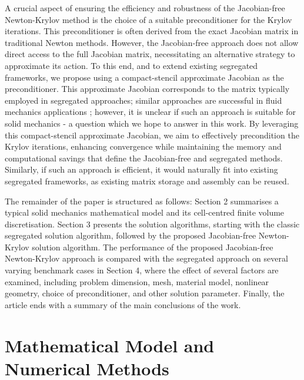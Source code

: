 \documentclass[sn-mathphys,Numbered]{sn-jnl}%
\begin{document}
A crucial aspect of ensuring the efficiency and robustness of the Jacobian-free Newton-Krylov method is the choice of a suitable preconditioner for the Krylov iterations.
This preconditioner is often derived from the exact Jacobian matrix in traditional Newton methods.
However, the Jacobian-free approach does not allow direct access to the full Jacobian matrix, necessitating an alternative strategy to approximate its action.
To this end, and to extend existing segregated frameworks, we propose using a compact-stencil approximate Jacobian as the preconditioner. This approximate Jacobian corresponds to the matrix typically employed in segregated approaches; similar approaches are successful in fluid mechanics applications \citep{Nishikawa2020, nonNewtonianJFNKPaper}; however, it is unclear if such an approach is suitable for solid mechanics - a question which we hope to answer in this work.
By leveraging this compact-stencil approximate Jacobian, we aim to effectively precondition the Krylov iterations, enhancing convergence while maintaining the memory and computational savings that define the Jacobian-free and segregated methods.
Similarly, if such an approach is efficient, it would naturally fit into existing segregated frameworks, as existing matrix storage and assembly can be reused.

The remainder of the paper is structured as follows:
Section 2 summarises a typical solid mechanics mathematical model and its cell-centred finite volume discretisation.
Section 3 presents the solution algorithms, starting with the classic segregated solution algorithm, followed by the proposed Jacobian-free Newton-Krylov solution algorithm.
The performance of the proposed Jacobian-free Newton-Krylov approach is compared with the segregated approach on several varying benchmark cases in Section 4, where the effect of several factors are examined, including problem dimension, mesh, material model, nonlinear geometry, choice of preconditioner, and other solution parameter.
Finally, the article ends with a summary of the main conclusions of the work.


\section{Mathematical Model and Numerical Methods}\label{sec:math_model}

%
\end{document}
